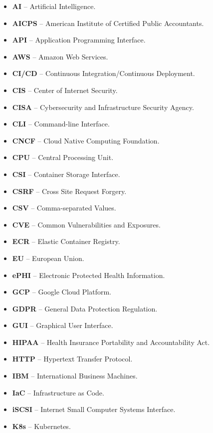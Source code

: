 \begin{itemize}
    \setlength\itemsep{1px}
    \item \textbf{AI} -- Artificial Intelligence.
    \item \textbf{AICPS} -- American Institute of Certified Public Accountants.
    \item \textbf{API} -- Application Programming Interface.
    \item \textbf{AWS} -- Amazon Web Services.
    \item \textbf{CI/CD} -- Continuous Integration/Continuous Deployment.
    \item \textbf{CIS} -- Center of Internet Security.
    \item \textbf{CISA} -- Cybersecurity and Infrastructure Security Agency.
    \item \textbf{CLI} -- Command-line Interface.
    \item \textbf{CNCF} -- Cloud Native Computing Foundation.
    \item \textbf{CPU} -- Central Processing Unit.
    \item \textbf{CSI} -- Container Storage Interface.
    \item \textbf{CSRF} -- Cross Site Request Forgery.
    \item \textbf{CSV} -- Comma-separated Values.
    \item \textbf{CVE} -- Common Vulnerabilities and Exposures.
    \item \textbf{ECR} -- Elastic Container Registry.
    \item \textbf{EU} -- European Union.
    \item \textbf{ePHI} -- Electronic Protected Health Information.
    \item \textbf{GCP} -- Google Cloud Platform.
    \item \textbf{GDPR} -- General Data Protection Regulation.
    \item \textbf{GUI} -- Graphical User Interface.
    \item \textbf{HIPAA} -- Health Insurance Portability and Accountability Act.
    \item \textbf{HTTP} -- Hypertext Transfer Protocol.
    \item \textbf{IBM} -- International Business Machines.
    \item \textbf{IaC} -- Infrastructure as Code.
    \item \textbf{iSCSI} -- Internet Small Computer Systems Interface.
    \item \textbf{K8s} -- Kubernetes.

\end{itemize}
